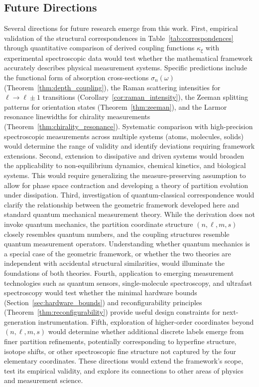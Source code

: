 \documentclass[twocolumn,10pt,a4paper]{article}
\theoremstyle{remark}
\begin{document}
\subsection{Future Directions}

Several directions for future research emerge from this work. First, empirical validation of the structural correspondences in Table~\ref{tab:correspondences} through quantitative comparison of derived coupling functions $\kappa_\xi$ with experimental spectroscopic data would test whether the mathematical framework accurately describes physical measurement systems. Specific predictions include the functional form of absorption cross-sections $\sigma_n(\omega)$ (Theorem~\ref{thm:depth_coupling}), the Raman scattering intensities for $\ell \to \ell \pm 1$ transitions (Corollary~\ref{cor:raman_intensity}), the Zeeman splitting patterns for orientation states (Theorem~\ref{thm:zeeman}), and the Larmor resonance linewidths for chirality measurements (Theorem~\ref{thm:chirality_resonance}). Systematic comparison with high-precision spectroscopic measurements across multiple systems (atoms, molecules, solids) would determine the range of validity and identify deviations requiring framework extensions. Second, extension to dissipative and driven systems would broaden the applicability to non-equilibrium dynamics, chemical kinetics, and biological systems. This would require generalizing the measure-preserving assumption to allow for phase space contraction and developing a theory of partition evolution under dissipation. Third, investigation of quantum-classical correspondence would clarify the relationship between the geometric framework developed here and standard quantum mechanical measurement theory. While the derivation does not invoke quantum mechanics, the partition coordinate structure $(n, \ell, m, s)$ closely resembles quantum numbers, and the coupling structures resemble quantum measurement operators. Understanding whether quantum mechanics is a special case of the geometric framework, or whether the two theories are independent with accidental structural similarities, would illuminate the foundations of both theories. Fourth, application to emerging measurement technologies such as quantum sensors, single-molecule spectroscopy, and ultrafast spectroscopy would test whether the minimal hardware bounds (Section~\ref{sec:hardware_bounds}) and reconfigurability principles (Theorem~\ref{thm:reconfigurability}) provide useful design constraints for next-generation instrumentation. Fifth, exploration of higher-order coordinates beyond $(n, \ell, m, s)$ would determine whether additional discrete labels emerge from finer partition refinements, potentially corresponding to hyperfine structure, isotope shifts, or other spectroscopic fine structure not captured by the four elementary coordinates. These directions would extend the framework's scope, test its empirical validity, and explore its connections to other areas of physics and measurement science.
\end{document}

